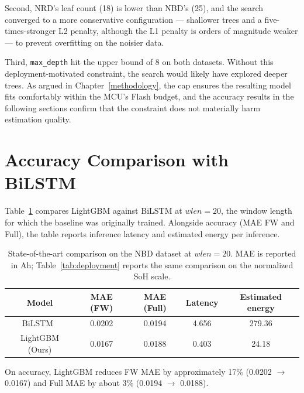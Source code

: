 Second, NRD's leaf count (18) is lower than NBD's (25), and the search converged to a more conservative configuration --- shallower trees and a five-times-stronger L2 penalty, although the L1 penalty is orders of magnitude weaker --- to prevent overfitting on the noisier data.

Third, \texttt{max\_depth} hit the upper bound of 8 on both datasets. Without this deployment-motivated constraint, the search would likely have explored deeper trees. As argued in Chapter~\ref{methodology}, the cap ensures the resulting model fits comfortably within the MCU's Flash budget, and the accuracy results in the following sections confirm that the constraint does not materially harm estimation quality.


\section{Accuracy Comparison with BiLSTM}
\label{sec:exp_sota}

Table~\ref{tab:sota} compares LightGBM against BiLSTM at $wlen = 20$, the window length for which the baseline was originally trained. Alongside accuracy (MAE FW and Full), the table reports inference latency and estimated energy per inference.

\begin{table}[H]
    \centering
    \setcellgapes{3pt}
    \makegapedcells
    \begin{tabular}{c c c c c}
    \hline
    Model & \makecell{MAE (FW) \\ \relax[Ah]} & \makecell{MAE (Full) \\ \relax[Ah]} & \makecell{Latency \\ \relax[ms]} & \makecell{Estimated energy \\ \relax[$\mu$J]} \\
    \hline
    BiLSTM~\autocite{Sammartino2021} & 0.0202 & 0.0194 & 4.656 & 279.36 \\
    LightGBM (Ours) & 0.0167 & 0.0188 & 0.403 & 24.18 \\
    \hline
    \end{tabular}
    \caption{State-of-the-art comparison on the NBD dataset at $wlen = 20$. MAE is reported in Ah; Table~\ref{tab:deployment} reports the same comparison on the normalized SoH scale.}
    \label{tab:sota}
\end{table}

On accuracy, LightGBM reduces FW MAE by approximately 17\% (0.0202 $\rightarrow$ 0.0167) and Full MAE by about 3\% (0.0194 $\rightarrow$ 0.0188).

